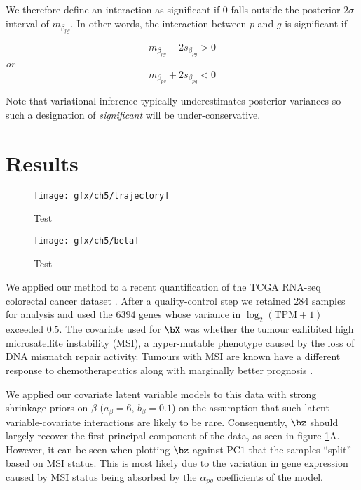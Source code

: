 We therefore define an interaction as significant if $0$ falls outside the posterior $2 \sigma$ interval of $m_{\beta_{pg}}$. In other words, the interaction between $p$ and $g$ is significant if

\begin{equation}
m_{\beta_{pg}} - 2 s_{\beta_{pg}} > 0
\end{equation}
\emph{or}
\begin{equation}
m_{\beta_{pg}} + 2 s_{\beta_{pg}} < 0
\end{equation}

Note that variational inference typically underestimates posterior variances \cite{blei2016variational} so such a designation of \emph{significant} will be under-conservative.

\section{Results}



\begin{figure}[h]
  \centering
  \texttt{[image: gfx/ch5/trajectory]}
  \caption{Test}
 \label{fig:trajectory}
\end{figure}

\begin{figure}[h]
  \centering
  \texttt{[image: gfx/ch5/beta]}
  \caption{Test}
 \label{fig:beta}
\end{figure}

We applied our method to a recent quantification \cite{tatlow2016cloud} of the TCGA RNA-seq colorectal cancer dataset \cite{weinstein2013cancer}. After a quality-control step we retained 284 samples for analysis and used the 6394 genes whose variance in $\log_2(\text{TPM}+1)$ exceeded $0.5$. The covariate used for $\bX$ was whether the tumour exhibited high microsatellite instability (MSI), a hyper-mutable phenotype caused by the loss of DNA mismatch repair activity.  Tumours with MSI are known have a different response to chemotherapeutics along with marginally better prognosis \cite{boland2010microsatellite}.

We applied our covariate latent variable models to this data with strong shrinkage priors on $\beta$ ($a_\beta = 6$, $b_\beta=0.1$) on the assumption that such latent variable-covariate interactions are likely to be rare. Consequently, $\bz$ should largely recover the first principal component of the data, as seen in figure \ref{fig:trajectory}A. However, it can be seen when plotting $\bz$ against $\text{PC1}$ that the samples ``split'' based on MSI status. This is most likely due to the variation in gene expression caused by MSI status being absorbed by the $\alpha_{pg}$ coefficients of the model.

